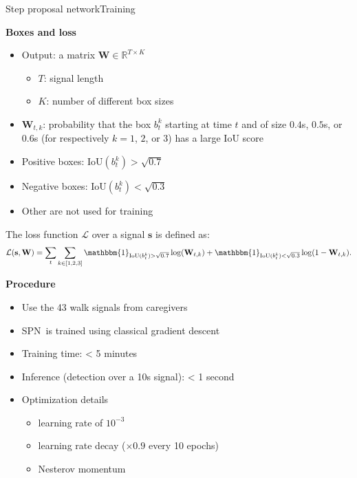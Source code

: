 \documentclass[8pt,t,aspectratio=1610]{beamer}
\newcommand{\subalgo}{{\small\textsc{SPN}}\ }
\newcommand{\bfs}{\mathbf{s}}
\newcommand{\bbmind}{\mathbbm{1}}
\newcommand{\iou}{\mathrm{IoU}}
\begin{document}
\begin{frame}[noframenumbering]{Step proposal network}{Training}

\begin{minipage}[t]{0.49\linewidth}\vspace{0pt}
\centering\textbf{Boxes and loss}
\begin{itemize}
    \item Output: a matrix $\mathbf{W} \in \mathbb{R}^{T \times K}$
    \begin{itemize}
        \item $T$: signal length
        \item $K$: number of different box sizes
    \end{itemize}

    \item $\mathbf{W}_{t,k}$: probability that the box $b_t^k$ starting at time $t$ and of size $0.4$s, $0.5$s, or $0.6$s (for respectively $k=1$, $2$, or $3$) has a large $\iou$ score
    \item Positive boxes: $\iou(b_t^{k}) > \sqrt{0.7}$
    \item Negative boxes: $\iou(b_t^{k}) < \sqrt{0.3}$
    \item Other are not used for training
\end{itemize}

\vspace{0.1cm}

The loss function $\mathcal{L}$ over a signal $\bfs$ is defined as:
\begin{equation*}\label{eq: loss training CNN}
\mathcal{L}(\bfs, \mathbf{W}) = \sum_{t} \sum_{k \in \left[1, 2, 3 \right]} \bbmind_{ \iou(b_t^{k})> \sqrt{0.7} } \log(\mathbf{W}_{t,k}) + \bbmind_{ \iou(b_t^{k})< \sqrt{0.3} } \log(1-\mathbf{W}_{t,k}). 
\end{equation*}

\end{minipage}\hfill
\begin{minipage}[t]{0.49\linewidth}\vspace{0pt}
\centering\textbf{Procedure}
    \begin{itemize}
        \item Use the 43 walk signals from caregivers
        \item \subalgo is trained using classical gradient descent
        \item Training time: < 5 minutes
        \item Inference (detection over a 10s signal): < 1 second
        \item Optimization details
        \begin{itemize}
            \item learning rate of $10^{-3}$
            \item learning rate decay ($\times 0.9$ every 10 epochs)
            \item Nesterov momentum
        \end{itemize}
    \end{itemize}
\end{minipage}

\end{frame}
\end{document}
